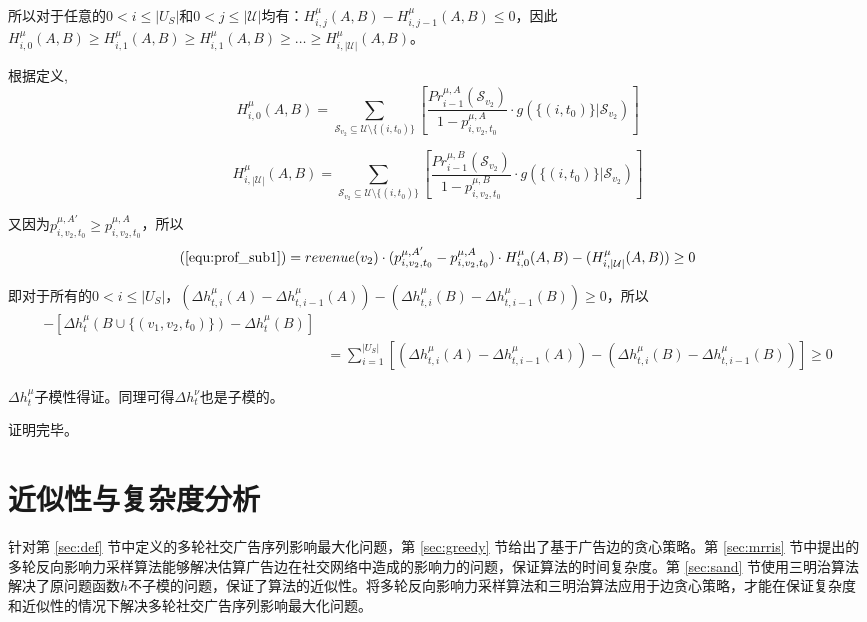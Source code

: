 所以对于任意的$0<i\le |U_S|$和$0<j\le |\mathcal{U}|$均有：$H_{i,j}^{\mu}(A,B)-H_{i,j-1}^{\mu}(A,B) \le 0$，因此$H_{i,0}^{\mu} (A,B)\ge H_{i,1}^{\mu}(A,B) \ge H_{i,1}^{\mu}(A,B) \ge \ldots \ge H_{i,|\mathcal{U}|}^{\mu}(A,B)$。

根据定义,
\begin{equation}
H_{i,0}^{\mu} (A,B)= \sum_{\mathcal{S}_{v_2}\subseteq \mathcal{U}\setminus \{(i,t_0)\}}\left[\frac{Pr_{i-1}^{\mu,A}(\mathcal{S}_{v_2})}{1-p_{i,v_2,t_0}^{\mu,A}} \cdot g(\{(i,t_0)\} |\mathcal{S}_{v_2})\right]
\end{equation}

\begin{equation}
H_{i,|\mathcal{U}|}^{\mu} (A,B)= \sum_{\mathcal{S}_{v_2}\subseteq \mathcal{U}\setminus \{(i,t_0)\}}\left[\frac{Pr_{i-1}^{\mu,B}(\mathcal{S}_{v_2})}{1-p_{i,v_2,t_0}^{\mu,B}} \cdot g(\{(i,t_0)\} |\mathcal{S}_{v_2})\right]
\end{equation}

又因为$p_{i,v_2,t_0}^{\mu,A'}\ge p_{i,v_2,t_0}^{\mu,A}$，所以
\begin{equation}
(\ref{equ:prof_sub1})=revenue(v_2)\cdot (p_{i,v_2,t_0}^{\mu,A'}-p_{i,v_2,t_0}^{\mu,A})\cdot H_{i,0}^{\mu}(A,B)-(H_{i,|\mathcal{U}|}^{\mu}(A,B)) \ge 0
\end{equation}

即对于所有的$0<i \le |U_S|$，$(\Delta h_{t,i}^{\mu}(A)-\Delta h_{t,i-1}^{\mu}(A)) - (\Delta h_{t,i}^{\mu}(B)-\Delta h_{t,i-1}^{\mu}(B)) \ge 0$，所以
\begin{align}
    [\Delta h_t^\mu(A \cup \{(v_1,v_2,t_0)\}&-\Delta h_t^\mu(A))]- [\Delta h_t^\mu(B\cup \{(v_1,v_2,t_0)\})-\Delta h_t^\mu(B)]\\ 
    &=\sum_{i=1}^{|U_S|}[(\Delta h_{t,i}^{\mu}(A)-\Delta h_{t,i-1}^{\mu}(A)) - (\Delta h_{t,i}^{\mu}(B)-\Delta h_{t,i-1}^{\mu}(B))] \ge 0
\end{align}

$\Delta h_t^\mu$子模性得证。同理可得$\Delta h_t^\nu$也是子模的。

\noindent 证明完毕。

\section{近似性与复杂度分析}
\label{sec:ana}

针对第 \ref{sec:def} 节中定义的多轮社交广告序列影响最大化问题，第 \ref{sec:greedy} 节给出了基于广告边的贪心策略。第 \ref{sec:mrris} 节中提出的多轮反向影响力采样算法能够解决估算广告边在社交网络中造成的影响力的问题，保证算法的时间复杂度。第 \ref{sec:sand} 节使用三明治算法解决了原问题函数$h$不子模的问题，保证了算法的近似性。将多轮反向影响力采样算法和三明治算法应用于边贪心策略，才能在保证复杂度和近似性的情况下解决多轮社交广告序列影响最大化问题。

